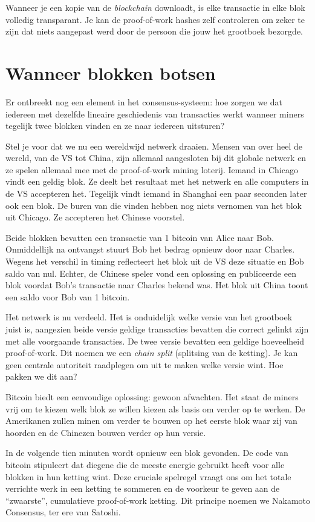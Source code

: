 Wanneer je een kopie van de \textit{blockchain} downloadt, is elke transactie in elke blok volledig transparant. Je kan de proof-of-work hashes zelf controleren om zeker te zijn dat niets aangepast werd door de persoon die jouw het grootboek bezorgde.

\section{Wanneer blokken botsen}
Er ontbreekt nog een element in het consensus-systeem: hoe zorgen we dat iedereen met dezelfde lineaire geschiedenis van transacties werkt wanneer miners tegelijk twee blokken vinden en ze naar iedereen uitsturen?

Stel je voor dat we nu een wereldwijd netwerk draaien. Mensen van over heel de wereld, van de VS tot China, zijn allemaal aangesloten bij dit globale netwerk en ze spelen allemaal mee met de proof-of-work mining loterij. Iemand in Chicago vindt een geldig blok. Ze deelt het resultaat met het netwerk en alle computers in de VS accepteren het. Tegelijk vindt iemand in Shanghai een paar seconden later ook een blok. De buren van die vinden hebben nog niets vernomen van het blok uit Chicago. Ze accepteren het Chinese voorstel.

Beide blokken bevatten een transactie van 1 bitcoin van Alice naar Bob. Onmiddellijk na ontvangst stuurt Bob het bedrag opnieuw door naar Charles. Wegens het verschil in timing reflecteert het blok uit de VS deze situatie en Bob saldo van nul. Echter, de Chinese speler vond een oplossing en publiceerde een blok voordat Bob’s transactie naar Charles bekend was. Het blok uit China toont een saldo voor Bob van 1 bitcoin.

Het netwerk is nu verdeeld. Het is onduidelijk welke versie van het grootboek juist is, aangezien beide versie geldige transacties bevatten die correct gelinkt zijn met alle voorgaande transacties. De twee versie bevatten een geldige hoeveelheid proof-of-work. Dit noemen we een \textit{chain split} (splitsing van de ketting). Je kan geen centrale autoriteit raadplegen om uit te maken welke versie wint. Hoe pakken we dit aan?

Bitcoin biedt een eenvoudige oplossing: gewoon afwachten. Het staat de miners vrij om te kiezen welk blok ze willen kiezen als basis om verder op te werken. De Amerikanen zullen minen om verder te bouwen op het eerste blok waar zij van hoorden en de Chinezen bouwen verder op hun versie.

In de volgende tien minuten wordt opnieuw een blok gevonden. De code van bitcoin stipuleert dat diegene die de meeste energie gebruikt heeft voor alle blokken in hun ketting wint. Deze cruciale spelregel vraagt ons om het totale verrichte werk in een ketting te sommeren en de voorkeur te geven aan de “zwaarste”, cumulatieve proof-of-work ketting. Dit principe noemen we Nakamoto Consensus, ter ere van Satoshi.

